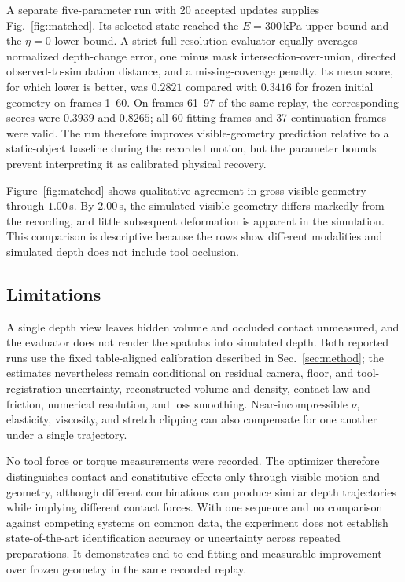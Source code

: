A separate five-parameter run with 20 accepted updates supplies Fig.~\ref{fig:matched}. Its selected state reached the $E=300\,$kPa upper bound and the $\eta=0$ lower bound. A strict full-resolution evaluator equally averages normalized depth-change error, one minus mask intersection-over-union, directed observed-to-simulation distance, and a missing-coverage penalty. Its mean score, for which lower is better, was $0.2821$ compared with $0.3416$ for frozen initial geometry on frames 1--60. On frames 61--97 of the same replay, the corresponding scores were $0.3939$ and $0.8265$; all 60 fitting frames and 37 continuation frames were valid. The run therefore improves visible-geometry prediction relative to a static-object baseline during the recorded motion, but the parameter bounds prevent interpreting it as calibrated physical recovery.

Figure~\ref{fig:matched} shows qualitative agreement in gross visible geometry through $1.00\,$s. By $2.00\,$s, the simulated visible geometry differs markedly from the recording, and little subsequent deformation is apparent in the simulation. This comparison is descriptive because the rows show different modalities and simulated depth does not include tool occlusion.

\subsection{Limitations}

A single depth view leaves hidden volume and occluded contact unmeasured, and the evaluator does not render the spatulas into simulated depth. Both reported runs use the fixed table-aligned calibration described in Sec.~\ref{sec:method}; the estimates nevertheless remain conditional on residual camera, floor, and tool-registration uncertainty, reconstructed volume and density, contact law and friction, numerical resolution, and loss smoothing. Near-incompressible $\nu$, elasticity, viscosity, and stretch clipping can also compensate for one another under a single trajectory.

No tool force or torque measurements were recorded. The optimizer therefore distinguishes contact and constitutive effects only through visible motion and geometry, although different combinations can produce similar depth trajectories while implying different contact forces. With one sequence and no comparison against competing systems on common data, the experiment does not establish state-of-the-art identification accuracy or uncertainty across repeated preparations. It demonstrates end-to-end fitting and measurable improvement over frozen geometry in the same recorded replay.

\FloatBarrier
